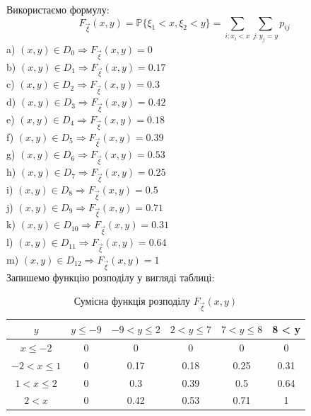 \documentclass[14pt, a4paper, ukrainian]{extreport}
\begin{document}
	Використаємо формулу:
	$$ F_{\vec \xi }(x, y) = \mathbb{P} \{\xi_1 < x, \xi_2 < y\} = \sum_{i:x_i < x} \sum_{j:y_j = y} p_{ij}$$
	a) $(x, y) \in D_0 \Rightarrow F_{\vec \xi}(x, y) = 0$\\
	b) $(x, y) \in D_1 \Rightarrow F_{\vec \xi}(x, y) = 0.17$\\
	c) $(x, y) \in D_2 \Rightarrow F_{\vec \xi}(x, y) = 0.3$\\
	d) $(x, y) \in D_3 \Rightarrow F_{\vec \xi}(x, y) = 0.42$\\
	e) $(x, y) \in D_4 \Rightarrow F_{\vec \xi}(x, y) = 0.18$\\
	f) $(x, y) \in D_5 \Rightarrow F_{\vec \xi}(x, y) = 0.39$\\
	g) $(x, y) \in D_6 \Rightarrow F_{\vec \xi}(x, y) = 0.53$\\
	h) $(x, y) \in D_7 \Rightarrow F_{\vec \xi}(x, y) = 0.25$\\
	i) $(x, y) \in D_8 \Rightarrow F_{\vec \xi}(x, y) = 0.5$\\
	j) $(x, y) \in D_9 \Rightarrow F_{\vec \xi}(x, y) = 0.71$\\
	k) $(x, y) \in D_{10} \Rightarrow F_{\vec \xi}(x, y) = 0.31$\\
	l) $(x, y) \in D_{11} \Rightarrow F_{\vec \xi}(x, y) = 0.64$\\
	m) $(x, y) \in D_{12} \Rightarrow F_{\vec \xi}(x, y) = 1$\\
	
	Запишемо функцію розподілу у вигляді таблиці:
	
	\begin{table}[H]
		\caption{\label{tab:Fxy}Сумісна функція розподілу $F_{\vec \xi}(x, y)$}
		\begin{center}
			\begin{tabular}{| c | c | c | c | c | c |}
				\hline
				\backslashbox{$x$} {$y$} & $y \le -9$ & $ -9 < y \le 2$ & $ 2 < y \le 7 $& $ 7 < y \le 8 $ & 8 < y\\
				\hline
				$ x \le -2 $ & 0 & 0 & 0 & 0 & 0\\
				\hline
				$ -2 < x \le 1 $ & 0 & 0.17 & 0.18 & 0.25 & 0.31 \\
				\hline
				$ 1 < x \le 2 $ & 0 & 0.3 & 0.39 &  0.5 & 0.64\\
				\hline
				$ 2 < x $ & 0 & 0.42 & 0.53 & 0.71 & 1\\
				\hline
				
			\end{tabular}
		\end{center}
	\end{table}
\end{document}
